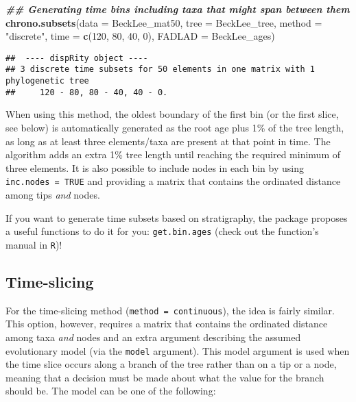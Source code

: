 \documentclass[
]{book}
\newenvironment{Shaded}{\begin{snugshade}}{\end{snugshade}}
\newcommand{\AttributeTok}[1]{\textcolor[rgb]{0.13,0.29,0.53}{#1}}
\newcommand{\DecValTok}[1]{\textcolor[rgb]{0.00,0.00,0.81}{#1}}
\newcommand{\DocumentationTok}[1]{\textcolor[rgb]{0.56,0.35,0.01}{\textbf{\textit{#1}}}}
\newcommand{\FunctionTok}[1]{\textcolor[rgb]{0.13,0.29,0.53}{\textbf{#1}}}
\newcommand{\NormalTok}[1]{#1}
\newcommand{\StringTok}[1]{\textcolor[rgb]{0.31,0.60,0.02}{#1}}
\begin{document}
\begin{Shaded}
\begin{Highlighting}[]
\DocumentationTok{\#\# Generating time bins including taxa that might span between them}
\FunctionTok{chrono.subsets}\NormalTok{(}\AttributeTok{data =}\NormalTok{ BeckLee\_mat50, }\AttributeTok{tree =}\NormalTok{ BeckLee\_tree,}
               \AttributeTok{method =} \StringTok{"discrete"}\NormalTok{,}
               \AttributeTok{time =} \FunctionTok{c}\NormalTok{(}\DecValTok{120}\NormalTok{, }\DecValTok{80}\NormalTok{, }\DecValTok{40}\NormalTok{, }\DecValTok{0}\NormalTok{), }\AttributeTok{FADLAD =}\NormalTok{ BeckLee\_ages)}
\end{Highlighting}
\end{Shaded}

\begin{verbatim}
##  ---- dispRity object ---- 
## 3 discrete time subsets for 50 elements in one matrix with 1 phylogenetic tree
##     120 - 80, 80 - 40, 40 - 0.
\end{verbatim}

When using this method, the oldest boundary of the first bin (or the first slice, see below) is automatically generated as the root age plus 1\% of the tree length, as long as at least three elements/taxa are present at that point in time.
The algorithm adds an extra 1\% tree length until reaching the required minimum of three elements.
It is also possible to include nodes in each bin by using \texttt{inc.nodes\ =\ TRUE} and providing a matrix that contains the ordinated distance among tips \emph{and} nodes.

If you want to generate time subsets based on stratigraphy, the package proposes a useful functions to do it for you: \texttt{get.bin.ages} (check out the function's manual in \texttt{R})!

\hypertarget{time-slicing}{%
\subsection{Time-slicing}\label{time-slicing}}

For the time-slicing method (\texttt{method\ =\ continuous}), the idea is fairly similar.
This option, however, requires a matrix that contains the ordinated distance among taxa \emph{and} nodes and an extra argument describing the assumed evolutionary model (via the \texttt{model} argument).
This model argument is used when the time slice occurs along a branch of the tree rather than on a tip or a node, meaning that a decision must be made about what the value for the branch should be.
The model can be one of the following:
\end{document}
